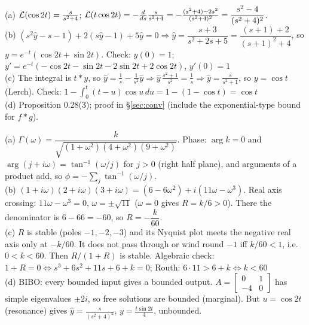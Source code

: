 \begin{solbox}[title={M3 solutions}]
(a) $\mathcal{L}(\cos2t)=\frac{s}{s^2+4}$; $\mathcal{L}(t\cos2t)=-\frac{d}{ds}\frac{s}{s^2+4}=-\frac{(s^2+4)-2s^2}{(s^2+4)^2}=\dfrac{s^2-4}{(s^2+4)^2}$.\\[1mm]
(b) $(s^2\hat y-s-1)+2(s\hat y-1)+5\hat y=0\Rightarrow\hat y=\dfrac{s+3}{s^2+2s+5}=\dfrac{(s+1)+2}{(s+1)^2+4}$, so $y=e^{-t}(\cos2t+\sin2t)$.
Check: $y(0)=1$; $y'=e^{-t}(-\cos2t-\sin2t-2\sin2t+2\cos2t)$, $y'(0)=1$ \checkmark\\[1mm]
(c) The integral is $t*y$, so $\hat y=\frac1s-\frac1{s^2}\hat y\Rightarrow\hat y\,\frac{s^2+1}{s^2}=\frac1s\Rightarrow\hat y=\frac{s}{s^2+1}$, so $y=\cos t$ (Lerch).
Check: $1-\int_0^t(t-u)\cos u\,du=1-(1-\cos t)=\cos t$ \checkmark\\[1mm]
(d) Proposition 0.28(3); proof in \S\ref{sec:conv} (include the exponential-type bound for $f*g$).
\end{solbox}
\begin{solbox}[title={M4 solutions}]
(a) $\Gamma(\omega)=\dfrac{k}{\sqrt{(1+\omega^2)(4+\omega^2)(9+\omega^2)}}$. Phase: $\arg k=0$ and $\arg(j+i\omega)=\tan^{-1}(\omega/j)$ for $j>0$ (right half plane), and arguments of a product add, so $\phi=-\sum_j\tan^{-1}(\omega/j)$.\\[1mm]
(b) $(1+i\omega)(2+i\omega)(3+i\omega)=(6-6\omega^2)+i(11\omega-\omega^3)$. Real axis crossing: $11\omega-\omega^3=0$, $\omega=\pm\sqrt{11}$ ($\omega=0$ gives $R=k/6>0$). There the denominator is $6-66=-60$, so $R=-\dfrac{k}{60}$.\\[1mm]
(c) $R$ is stable (poles $-1,-2,-3$) and its Nyquist plot meets the negative real axis only at $-k/60$. It does not pass through or wind round $-1$ iff $k/60<1$, i.e.\ $\boxed{0<k<60}$. Then $R/(1+R)$ is stable.
Algebraic check: $1+R=0\iff s^3+6s^2+11s+6+k=0$; Routh: $6\cdot11>6+k\iff k<60$ \checkmark\\[1mm]
(d) BIBO: every bounded input gives a bounded output. $A=\begin{bmatrix}0&1\\-4&0\end{bmatrix}$ has simple eigenvalues $\pm2i$, so free solutions are bounded (marginal). But $u=\cos2t$ (resonance) gives $\hat y=\frac{s}{(s^2+4)^2}$, $y=\frac{t\sin2t}{4}$, unbounded.
\end{solbox}
